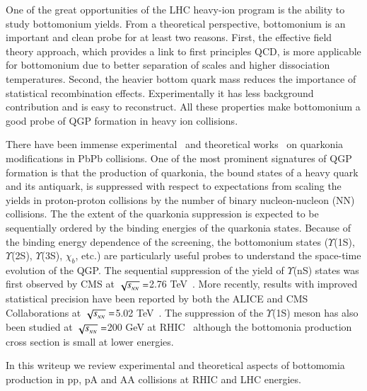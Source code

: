 One of the great opportunities of the 
LHC heavy-ion program is the ability to study bottomonium yields. 
From a theoretical perspective, bottomonium is an important and clean probe 
for at least two reasons. 
First, the effective field theory approach, which provides a link to first 
principles QCD, is more applicable for bottomonium due to better separation of 
scales and higher dissociation temperatures. Second, the heavier bottom quark 
mass reduces the importance of statistical recombination effects.
Experimentally it has less background contribution and is easy to reconstruct. 
All these properties make bottomonium a good probe of 
QGP formation in heavy ion collisions.


There have been immense experimental~\cite{Sirunyan:2017isk,Sirunyan:2018nsz,Acharya:2019iur,Acharya:2018mni}
and theoretical works~\cite{Strickland:2011mw,Song:2011nu,Kumar:2014kfa,Kumar:2019xdj} on
quarkonia modifications in PbPb collisions.
One of the most prominent signatures of QGP
formation is that the production of quarkonia, the bound states of a heavy quark and its antiquark,
is suppressed with respect to expectations from scaling the yields in proton-proton collisions
by the number of binary nucleon-nucleon
(NN) collisions.
 The the extent of the quarkonia suppression is
expected to be sequentially ordered by the binding energies of the quarkonia states. Because of
the binding energy
dependence of the screening, the bottomonium states ($\Upsilon$(1S), $\Upsilon$(2S),
$\Upsilon$(3S), $\chi_{b}$, etc.) are particularly useful probes to understand the space-time evolution
of the QGP. The sequential suppression of the yield of $\Upsilon$(nS) states was first observed by
CMS at $\sqrt{s_{_{NN}}} =$2.76 TeV~\cite{Chatrchyan:2011pe,Chatrchyan:2012lxa}. More recently, results with improved
statistical precision have been reported by both the ALICE and CMS Collaborations at $\sqrt{s_{_{NN}}} =$5.02
TeV~\cite{ALICE:2018wzm,Sirunyan:2018nsz,Sirunyan:2017lzi}. The suppression of the $\Upsilon$(1S)
meson has also been studied at $\sqrt{s_{_{NN}}} =$200 GeV at RHIC~\cite{STAR:2013kwk} although the
bottomonia production cross section is small at lower energies. 

In this writeup we review experimental and theoretical aspects of bottomomia production in pp, pA
and AA collisions at RHIC and LHC energies.







